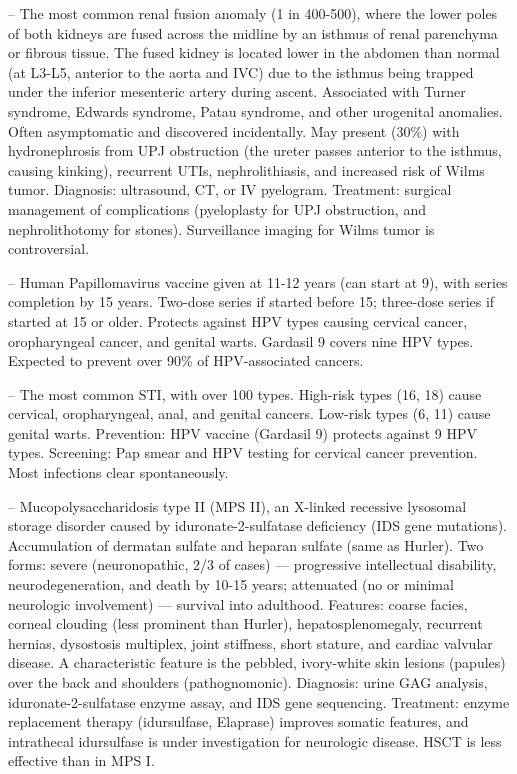 -- The most common renal fusion anomaly (1 in 400-500), where the lower poles of both kidneys are fused across the midline by an isthmus of renal parenchyma or fibrous tissue. The fused kidney is located lower in the abdomen than normal (at L3-L5, anterior to the aorta and IVC) due to the isthmus being trapped under the inferior mesenteric artery during ascent. Associated with Turner syndrome, Edwards syndrome, Patau syndrome, and other urogenital anomalies. Often asymptomatic and discovered incidentally. May present (30\%) with hydronephrosis from UPJ obstruction (the ureter passes anterior to the isthmus, causing kinking), recurrent UTIs, nephrolithiasis, and increased risk of Wilms tumor. Diagnosis: ultrasound, CT, or IV pyelogram. Treatment: surgical management of complications (pyeloplasty for UPJ obstruction, and nephrolithotomy for stones). Surveillance imaging for Wilms tumor is controversial.

-- Human Papillomavirus vaccine given at 11-12 years (can start at 9), with series completion by 15 years. Two-dose series if started before 15; three-dose series if started at 15 or older. Protects against HPV types causing cervical cancer, oropharyngeal cancer, and genital warts. Gardasil 9 covers nine HPV types. Expected to prevent over 90\% of HPV-associated cancers.

-- The most common STI, with over 100 types. High-risk types (16, 18) cause cervical, oropharyngeal, anal, and genital cancers. Low-risk types (6, 11) cause genital warts. Prevention: HPV vaccine (Gardasil 9) protects against 9 HPV types. Screening: Pap smear and HPV testing for cervical cancer prevention. Most infections clear spontaneously.

-- Mucopolysaccharidosis type II (MPS II), an X-linked recessive lysosomal storage disorder caused by iduronate-2-sulfatase deficiency (IDS gene mutations). Accumulation of dermatan sulfate and heparan sulfate (same as Hurler). Two forms: severe (neuronopathic, 2/3 of cases) — progressive intellectual disability, neurodegeneration, and death by 10-15 years; attenuated (no or minimal neurologic involvement) — survival into adulthood. Features: coarse facies, corneal clouding (less prominent than Hurler), hepatosplenomegaly, recurrent hernias, dysostosis multiplex, joint stiffness, short stature, and cardiac valvular disease. A characteristic feature is the pebbled, ivory-white skin lesions (papules) over the back and shoulders (pathognomonic). Diagnosis: urine GAG analysis, iduronate-2-sulfatase enzyme assay, and IDS gene sequencing. Treatment: enzyme replacement therapy (idursulfase, Elaprase) improves somatic features, and intrathecal idursulfase is under investigation for neurologic disease. HSCT is less effective than in MPS I.

